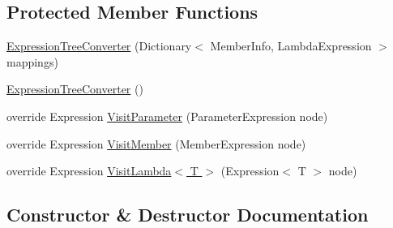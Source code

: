 \subsection*{Protected Member Functions}
\begin{DoxyCompactItemize}
\item 
\hyperlink{classCqrs_1_1Sql_1_1DataStores_1_1ExpressionTreeConverter_a6c0d0c72deab71e40aa9e1526fd82593_a6c0d0c72deab71e40aa9e1526fd82593}{Expression\+Tree\+Converter} (Dictionary$<$ Member\+Info, Lambda\+Expression $>$ mappings)
\item 
\hyperlink{classCqrs_1_1Sql_1_1DataStores_1_1ExpressionTreeConverter_a817ef7144b04df19798d7c5c718818b7_a817ef7144b04df19798d7c5c718818b7}{Expression\+Tree\+Converter} ()
\item 
override Expression \hyperlink{classCqrs_1_1Sql_1_1DataStores_1_1ExpressionTreeConverter_a88eef3bef4d4ad3caab1cd2cc033873b_a88eef3bef4d4ad3caab1cd2cc033873b}{Visit\+Parameter} (Parameter\+Expression node)
\item 
override Expression \hyperlink{classCqrs_1_1Sql_1_1DataStores_1_1ExpressionTreeConverter_ab6eca1d967e864aee4697f64ea9b23a0_ab6eca1d967e864aee4697f64ea9b23a0}{Visit\+Member} (Member\+Expression node)
\item 
override Expression \hyperlink{classCqrs_1_1Sql_1_1DataStores_1_1ExpressionTreeConverter_abf97079f29447cd8e0bcfab91891ccb9_abf97079f29447cd8e0bcfab91891ccb9}{Visit\+Lambda$<$ T $>$} (Expression$<$ T $>$ node)
\end{DoxyCompactItemize}


\subsection{Constructor \& Destructor Documentation}
\mbox{\label{classCqrs_1_1Sql_1_1DataStores_1_1ExpressionTreeConverter_a6c0d0c72deab71e40aa9e1526fd82593_a6c0d0c72deab71e40aa9e1526fd82593}} 
